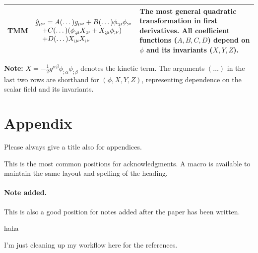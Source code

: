 \documentclass[a4paper,11pt]{article}
\begin{document}
\begin{table}[H]
\begin{tabularx}{\textwidth}{@{} p{4.3cm} p{5.8cm} X @{}}
TMM &
$\begin{array}[t]{@{}l@{}}
\hat{g}_{\mu \nu} = A(\dots) g_{\mu \nu} + B(\dots)\phi_{;\mu}\phi_{;\nu} \\
\quad + C(\dots)(\phi_{;\mu}X_{;\nu}+X_{;\mu}\phi_{;\nu}) \\
\quad + D(\dots)X_{;\mu}X_{;\nu}
\end{array}$ &
The most general quadratic transformation in first derivatives. All coefficient functions ($A, B, C, D$) depend on $\phi$ and its invariants ($X, Y, Z$). \\

\bottomrule
\end{tabularx}

\vspace{1em}
\footnotesize
\textbf{Note:} $X = -\frac{1}{2}g^{\alpha\beta}\phi_{;\alpha}\phi_{;\beta}$ denotes the kinetic term. The arguments $(\dots)$ in the last two rows are shorthand for $(\phi, X, Y, Z)$, representing dependence on the scalar field and its invariants.
\end{table}


\appendix
\section{Appendix} 
Please always give a title also for appendices.








\acknowledgments

This is the most common positions for acknowledgments. A macro is
available to maintain the same layout and spelling of the heading.

\paragraph{Note added.} This is also a good position for notes added
after the paper has been written.


haha




I'm just cleaning up my workflow here for the references.



\end{document}
